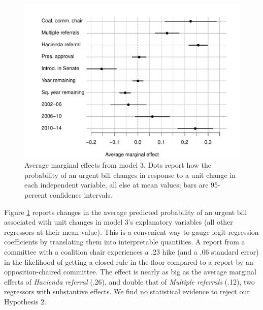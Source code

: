 \documentclass[letter,12pt]{article}
\begin{document}

\begin{figure}
  \centering
    \caption{Average marginal effects from model 3. Dots report how the probability of an urgent bill changes in response to a unit change in each independent variable, all else at mean values; bars are 95-percent confidence intervals.}\label{F:avgMg}
    \includegraphics[width=.8\columnwidth]{../graphs/avgMgEffects.pdf}
\end{figure}

Figure \ref{F:avgMg} reports changes in the average predicted probability of an urgent bill associated with unit changes in model 3's explanatory variables (all other regressors at their mean value). This is a convenient way to gauge logit regression coefficients by translating them into interpretable quantities. A report from a committee with a coalition chair experiences a .23 hike (and a .06 standard error) in the likelihood of getting a closed rule in the floor compared to a report by an opposition-chaired committee. The effect is nearly as big as the average marginal effects of \emph{Hacienda referral} (.26), and double that of \emph{Multiple referrals} (.12), two regressors with substantive effects. We find no statistical evidence to reject our Hypothesis 2.  
\end{document}
